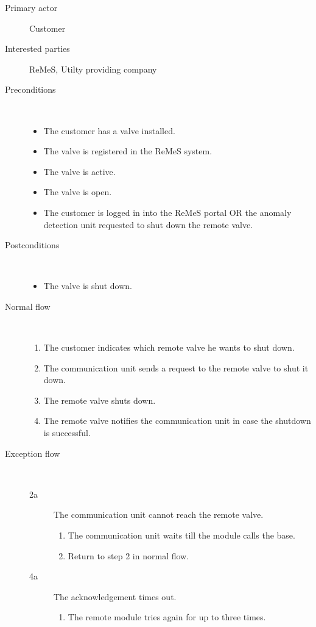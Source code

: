 \begin{description}
	\item[Primary actor] Customer
	\item[Interested parties] ReMeS, Utilty providing company
	\item[Preconditions] \ 
	\begin{itemize}
		\item The customer has a valve installed.
		\item The valve is registered in the ReMeS system.
		\item The valve is active.
		\item The valve is open.
		\item The customer is logged in into the ReMeS portal OR the anomaly detection
		unit requested to shut down the remote valve.
	\end{itemize}
	\item[Postconditions] \ 
	\begin{itemize}
		\item The valve is shut down.
	\end{itemize}
	\item[Normal flow] \ 
	\begin{enumerate}
	  	\item The customer indicates which remote valve he wants to shut down.
	  	\item The communication unit sends a request to the remote valve to shut it
	  	down.
	  	\item The remote valve shuts down.
	  	\item The remote valve notifies the communication unit in case the
	  	shutdown is successful.
	\end{enumerate}
	\item[Exception flow] \ 
	\begin{description}
		\item[2a] The communication unit cannot reach the remote valve.
		\begin{enumerate}
		  \item The communication unit waits till the module calls the base.
		  \item Return to step 2 in normal flow.
		\end{enumerate}
		\item[4a] The acknowledgement times out.
		\begin{enumerate}
			\item The remote module tries again for up to three times.
		\end{enumerate}
	\end{description}
\end{description}